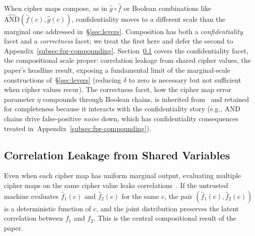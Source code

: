 \documentclass[conference]{IEEEtran}
\theoremstyle{definition}
\theoremstyle{plain}
\theoremstyle{remark}
\newcommand{\fhat}{\hat{f}}
\newcommand{\ghat}{\hat{g}}
\begin{document}
When cipher maps compose, as in $\ghat \circ \fhat$ or Boolean
combinations like $\widehat{\mathrm{AND}}(\fhat(c), \ghat(c))$,
confidentiality moves to a different scale than the marginal one
addressed in~\S\ref{sec:levers}.  Composition has both a
\emph{confidentiality} facet and a \emph{correctness} facet; we treat
the first here and defer the second to
Appendix~\ref{subsec:fpr-compounding}.
Section~\ref{subsec:correlation-leakage}
covers the confidentiality facet, the compositional scale proper:
correlation leakage from shared cipher values, the paper's headline
result, exposing a fundamental limit of the marginal-scale
constructions of~\S\ref{sec:levers} (reducing $\delta$ to zero is
necessary but not sufficient when cipher values recur).  The correctness
facet, how the cipher map error parameter $\eta$ compounds through
Boolean chains, is inherited from~\cite[Sec.~7.4]{towell2026cipher} and
retained for completeness because it interacts with the
confidentiality story (e.g., AND chains drive false-positive
\emph{noise} down, which has confidentiality consequences treated
in~Appendix~\ref{subsec:fpr-compounding}).

\subsection{Correlation Leakage from Shared Variables}
\label{subsec:correlation-leakage}

Even when each cipher map has uniform marginal output, evaluating multiple
cipher maps on the same cipher value leaks
correlations~\cite[Sec.~8.2]{towell2026cipher}.  If the untrusted machine
evaluates $\fhat_1(c)$ and $\fhat_2(c)$ for the same $c$, the pair
$(\fhat_1(c), \fhat_2(c))$ is a deterministic function of $c$, and the
joint distribution preserves the latent correlation between $f_1$ and
$f_2$.  This is the central compositional result of the paper.
\end{document}
